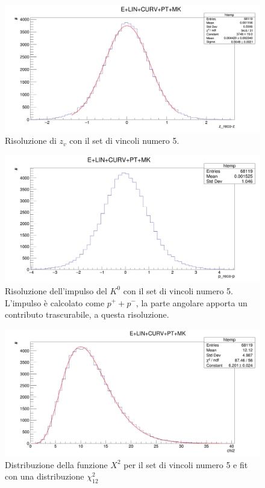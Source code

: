 \documentclass[8pt]{extarticle}
\begin{document}
\clearpage

\begin{figure}
	\begin{center}
		\includegraphics[scale=0.25]{set_5_z} 
		\caption{Risoluzione di $z_v$ con il set di vincoli numero 5.}
		\label{fig:set_5_z}
	\end{center}
\end{figure}

\begin{figure}
	\begin{center}
		\includegraphics[scale=0.25]{set_5_p} 
		\caption{Risoluzione dell'impulso del $K^0$ con il set di vincoli numero 5. L'impulso è calcolato come $p^+ + p^-$, la parte angolare apporta un contributo trascurabile, a questa risoluzione.}
		\label{fig:set_5_p}
	\end{center}
\end{figure}

\begin{figure}
	\begin{center}
		\includegraphics[scale=0.25]{set_5_chi2} 
		\caption{Distribuzione della funzione $X^2$ per il set di vincoli numero 5 e fit con una distribuzione $\chi^2_{12}$}
		\label{fig:set_5_chi2}
	\end{center}
\end{figure}
\end{document}
